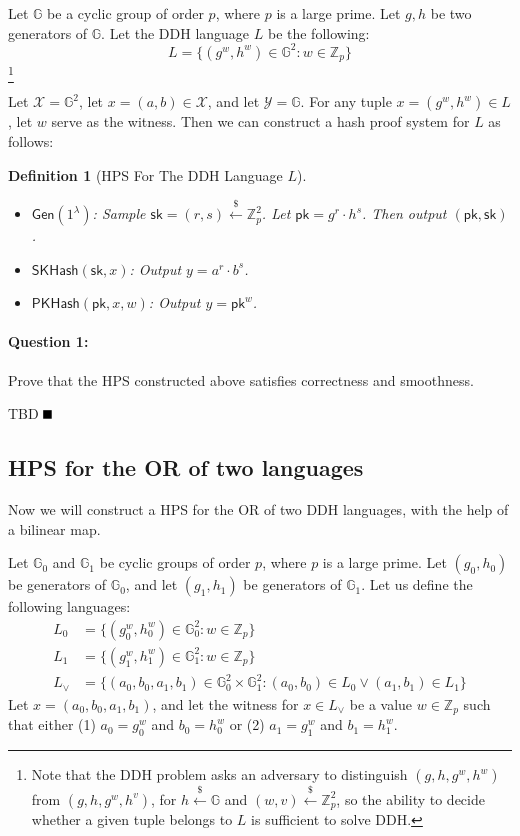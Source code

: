 \documentclass[11pt]{article}
\newtheorem{definition}[theorem]{Definition}
\newenvironment{solution}{\color{blue}\noindent{\bf Solution}\hspace*{1em}}{\qed\medskip}
\newcommand{\qed}{\mbox{}\hspace*{\fill}\nolinebreak\mbox{$\rule{0.6em}{0.6em}$}} %
\numberwithin{equation}{section}
\newcommand{\bbG}{\mathbb{G}}
\newcommand{\bbZ}{\mathbb{Z}}
\newcommand{\cX}{\mathcal{X}}
\newcommand{\cY}{\mathcal{Y}}
\newcommand{\Gen}{\mathsf{Gen}}
\newcommand{\pk}{\mathsf{pk}}
\newcommand{\sk}{\mathsf{sk}}
\newcommand{\secp}{\lambda}
\newcommand{\getsr}{\stackrel{\$}{\gets}}
\begin{document}
Let $\bbG$ be a cyclic group of order $p$, where $p$ is a large prime. Let $g, h$ be two generators of $\bbG$. Let the DDH language $L$ be the following:
\[L = \{(g^w, h^w) \in \bbG^2 : w \in \bbZ_p\}\]
\footnote{Note that the DDH problem asks an adversary to distinguish $(g, h, g^w, h^w)$ from $(g, h, g^w, h^v)$, for $h \getsr \bbG$ and $(w, v) \getsr \bbZ_p^2$, so the ability to decide whether a given tuple belongs to $L$ is sufficient to solve DDH.}

Let $\cX = \bbG^2$, let $x = (a, b) \in \cX$, and let $\cY = \bbG$. For any tuple $x = (g^w, h^w) \in L$, let $w$ serve as the witness. Then we can construct a hash proof system for $L$ as follows:

\begin{definition}[HPS For The DDH Language $L$]\label{def:hps-for-DDH-language}
$ $
\begin{itemize}
    \item $\Gen(1^\secp)$: Sample $\sk = (r, s) \getsr \bbZ_p^2$. Let $\pk = g^r \cdot h^s$. Then output $(\pk, \sk)$.
    \item $\mathsf{SKHash}(\sk, x)$: Output $y = a^r \cdot b^s$.
    \item $\mathsf{PKHash}(\pk, x, w)$: Output $y = \pk^w$.
\end{itemize}
\end{definition}

\paragraph{Question 1:} Prove that the HPS constructed above satisfies correctness and smoothness.

\vspace{5mm}
\begin{solution}
TBD
\end{solution}


\subsection{HPS for the OR of two languages}
Now we will construct a HPS for the OR of two DDH languages, with the help of a bilinear map.

Let $\bbG_0$ and $\bbG_1$ be cyclic groups of order $p$, where $p$ is a large prime. Let $(g_0, h_0)$ be generators of $\bbG_0$, and let $(g_1, h_1)$ be generators of $\bbG_1$. Let us define the following languages:
\begin{align*}
    L_0 &= \{(g_0^{w}, h_0^{w}) \in \bbG_0^2 : w \in \bbZ_p\}\\
    L_1 &= \{(g_1^{w}, h_1^{w}) \in \bbG_1^2 : w \in \bbZ_p\}\\
    L_\lor &= \{(a_0, b_0, a_1, b_1) \in \bbG_0^2 \times \bbG_1^2 : (a_0, b_0) \in L_0 \lor (a_1, b_1) \in L_1\}
\end{align*}
Let $x = (a_0, b_0, a_1, b_1)$, and let the witness for $x \in L_\lor$ be a value $w \in \bbZ_p$ such that either (1) $a_0 = g_0^w$ and $b_0 = h_0^w$ or (2) $a_1 = g_1^w$ and $b_1 = h_1^w$.
\end{document}
